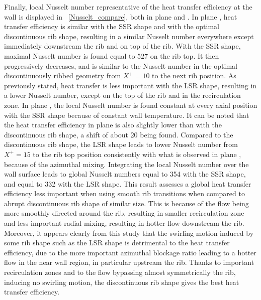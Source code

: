 Finally, local Nusselt number representative of the heat transfer efficiency at the wall is displayed in ~\cref{Nusselt_compare}, both in plane  and . In plane , heat transfer efficiency is similar with the SSR shape and with the optimal discontinuous rib shape, resulting in a similar Nusselt number everywhere except immediately downstream the rib and on top of the rib. With the SSR shape, maximal Nusselt number is found equal to $527$ on the rib top. It then progressively decreases, and is similar to the Nusselt number in the optimal discontinuously ribbed geometry from $X^+=10$ to the next rib position. As previously stated, heat transfer is less important with the LSR shape, resulting in a lower Nusselt number, except on the top of the rib and in the recirculation zone. In plane , the local Nusselt number is found constant at every axial position with the SSR shape because of constant wall temperature. It can be noted that the heat transfer efficiency in plane  is also slightly lower than with the discontinuous rib shape, a shift of about 20 being found. Compared to the discontinuous rib shape, the LSR shape leads to lower Nusselt number from $X^+=15$ to the rib top position consistently with what is observed in plane , because of the azimuthal mixing. Integrating the local Nusselt number over the wall surface leads to global Nusselt numbers equal to 354 with the SSR shape, and equal to 332 with the LSR shape. This result assesses a global heat transfer efficiency less important when using smooth rib transitions when compared to abrupt discontinuous rib shape of similar size. This is because of the flow being more smoothly directed around the rib, resulting in smaller recirculation zone and less important radial mixing, resulting in hotter flow downstream the rib. Moreover, it appears clearly from this study that the swirling motion induced by some rib shape such as the LSR shape is detrimental to the heat transfer efficiency, due to the more important azimuthal blockage ratio leading to a hotter flow in the near wall region, in particular upstream the rib. Thanks to important recirculation zones and to the flow bypassing almost symmetrically the rib, inducing no swirling motion, the discontinuous rib shape gives the best heat transfer efficiency.


